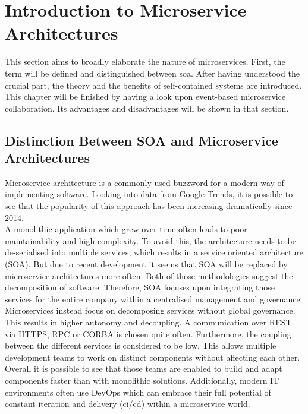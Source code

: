\section{Introduction to Microservice  Architectures}
\label{sec:techKnowHow}
This section aims to broadly elaborate the nature of microservices. First, the term will be defined and distinguished between \acrfull{soa}. After having understood the crucial part, the theory and the benefits of self-contained systems are introduced. This chapter will be finished by having a look upon event-based microservice  collaboration. Its advantages and disadvantages will be shown in that section. 

\subsection{Distinction Between SOA and Microservice Architectures}
Microservice architecture is a commonly used buzzword for a modern way of implementing software. Looking into data from Google Trends, it is possible to see that the popularity of this approach has been increasing dramatically since 2014. \cite{microservices}\newline
\\
A monolithic application which grew over time often leads to poor maintainability and high complexity. To avoid this, the architecture needs to be de-serialised into multiple services, which results in a service oriented architecture (SOA). But due to recent development it seems that SOA will be replaced by microservice architectures more often.\cite{mircorVSsoa}\newline
Both of those methodologies suggest the decomposition of software. Therefore, SOA focuses upon integrating those services for the entire company within a centralised management and governance. Microservices instead focus on decomposing services without global governance. This results in higher autonomy and decoupling. \cite{mircorVSsoa} A communication over REST via HTTPS, RPC or CORBA is chosen quite often.\newline
Furthermore, the coupling between the different services is considered to be low. This allows multiple development teams to work on distinct components without affecting each other. Overall it is possible to see that those teams are enabled to build and adapt components faster than with monolithic solutions. Additionally,  modern IT environments often use DevOps which can embrace their full potential of constant iteration and delivery (\acrshort{ci/cd}) within a microservice  world. \cite{redHatMicroservices}\newline
